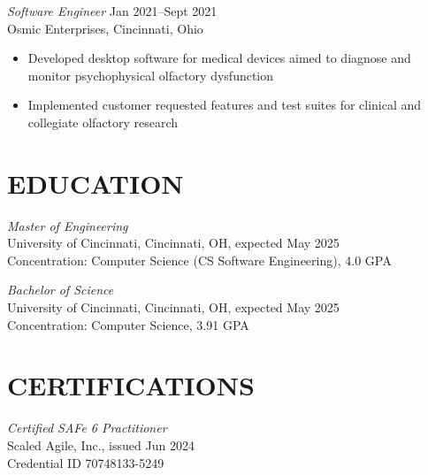 \documentclass[margin]{res} %
\begin{document}
\begin{resume}
\vspace*{-1.5mm}

{\sl Software Engineer} \hfill {\color{black} Jan 2021–Sept 2021}  \\
Osmic Enterprises, Cincinnati, Ohio 
\begin{itemize} \itemsep -2pt %
\item Developed desktop software for medical devices aimed to diagnose and monitor psychophysical olfactory dysfunction
\item Implemented customer requested features and test suites for clinical and collegiate olfactory research
\end{itemize}


\section{EDUCATION}

{\sl Master of Engineering }\\
University of Cincinnati, Cincinnati, OH, expected May 2025 \\
Concentration: Computer Science (CS Software Engineering), 4.0 GPA

\vspace*{-1.5mm}

{\sl Bachelor of Science}\\
University of Cincinnati, Cincinnati, OH, expected May 2025 \\
Concentration: Computer Science, 3.91 GPA


\section{CERTIFI\-CATIONS}

{\sl Certified SAFe\textsuperscript{\tiny\textregistered} 6 Practitioner}\\
Scaled Agile, Inc., issued Jun 2024\\
Credential ID 70748133-5249



\end{resume}
\end{document}
